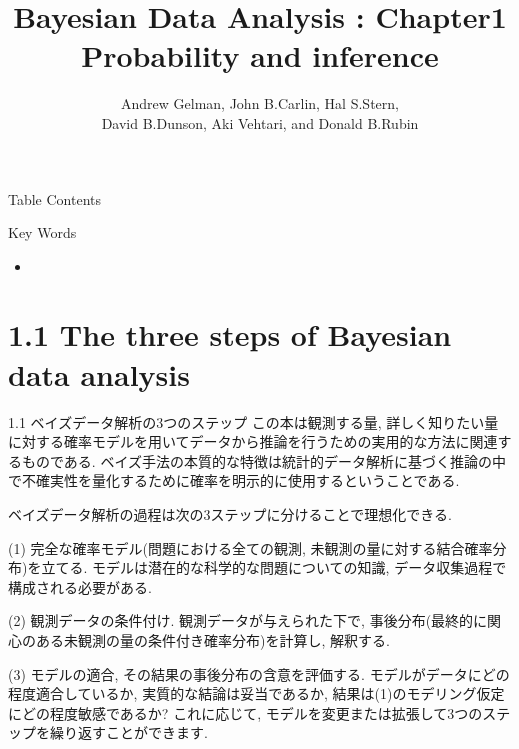 \documentclass[10pt,dvipdfmx,a4]{beamer}
\title{Bayesian Data Analysis : Chapter1 \\Probability and inference}
\subtitle{Andrew Gelman, John B.Carlin, Hal S.Stern,\\David B.Dunson, Aki Vehtari, and Donald B.Rubin}
\begin{document}
\frame{\titlepage}

\begin{frame}{Table Contents}
\begin{multicols}{2}
{\scriptsize \tableofcontents}
\end{multicols}
\end{frame}

\begin{frame}{Key Words}
\begin{multicols}{2}
{\scriptsize \begin{itemize}
\item 
\end{itemize}}
\end{multicols}
\end{frame}

\section{1.1 The three steps of Bayesian data analysis}
\begin{frame}{1.1 ベイズデータ解析の3つのステップ}
この本は観測する量, 詳しく知りたい量に対する確率モデルを用いてデータから推論を行うための実用的な方法に関連するものである.
ベイズ手法の本質的な特徴は統計的データ解析に基づく推論の中で不確実性を量化するために確率を明示的に使用するということである.

ベイズデータ解析の過程は次の3ステップに分けることで理想化できる.

(1) 完全な確率モデル(問題における全ての観測, 未観測の量に対する結合確率分布)を立てる.
モデルは潜在的な科学的な問題についての知識, データ収集過程で構成される必要がある.

(2) 観測データの条件付け.
観測データが与えられた下で, 事後分布(最終的に関心のある未観測の量の条件付き確率分布)を計算し, 解釈する.

(3) モデルの適合, その結果の事後分布の含意を評価する.
モデルがデータにどの程度適合しているか, 実質的な結論は妥当であるか, 結果は(1)のモデリング仮定にどの程度敏感であるか?
これに応じて, モデルを変更または拡張して3つのステップを繰り返すことができます.
\end{frame}

\end{document}
